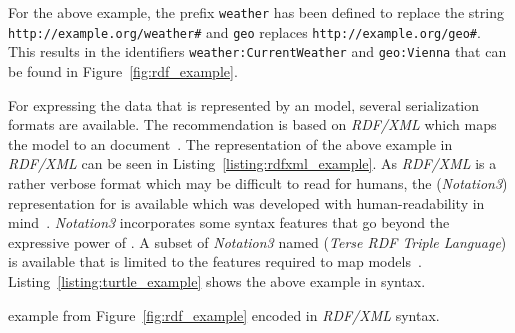 For the above example, the prefix \texttt{weather} has been defined to replace the string \texttt{http://\hspace{0pt}example.org/weather\#} and \texttt{geo} replaces \texttt{http://example.org/geo\#}. This results in the identifiers \texttt{weather:CurrentWeather} and \texttt{geo:Vienna} that can be found in Figure~\ref{fig:rdf_example}.

For expressing the data that is represented by an  model, several serialization formats are available. The  recommendation is based on \emph{RDF/XML} which maps the  model to an  document~\cite{RDF_XML}. The representation of the above example in \emph{RDF/XML} can be seen in Listing~\ref{listing:rdfxml_example}. As \emph{RDF/XML} is a rather verbose format which may be difficult to read for humans, the  (\emph{Notation3}) representation for  is available which was developed with human-readability in mind~\cite{Notation3}. \emph{Notation3} incorporates some syntax features that go beyond the expressive power of . A subset of \emph{Notation3} named  (\emph{Terse RDF Triple Language}) is available that is limited to the features required to map  models~\cite{Turtle}. Listing~\ref{listing:turtle_example} shows the above example in  syntax.


\begin{mintlisting}

\caption[ example in \emph{RDF/XML} syntax]{ example from Figure~\ref{fig:rdf_example} encoded in \emph{RDF/XML} syntax.}
\label{listing:rdfxml_example}
\end{mintlisting}


